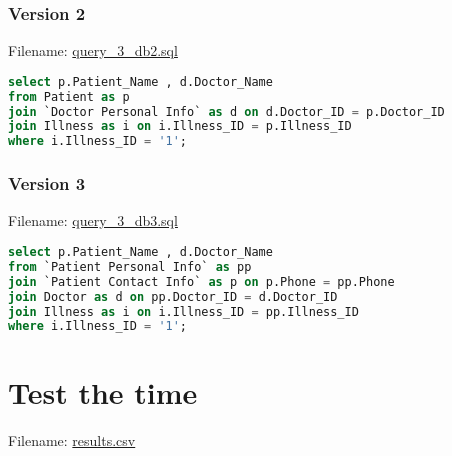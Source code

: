 \documentclass[12pt,arial]{article}
\begin{document}
\subsubsection{Version 2}
Filename: \url{query_3_db2.sql}
\begin{lstlisting}[language=SQL]
select p.Patient_Name , d.Doctor_Name
from Patient as p
join `Doctor Personal Info` as d on d.Doctor_ID = p.Doctor_ID
join Illness as i on i.Illness_ID = p.Illness_ID
where i.Illness_ID = '1';
\end{lstlisting}
\subsubsection{Version 3}
Filename: \url{query_3_db3.sql}
\begin{lstlisting}[language=SQL]
select p.Patient_Name , d.Doctor_Name
from `Patient Personal Info` as pp
join `Patient Contact Info` as p on p.Phone = pp.Phone
join Doctor as d on pp.Doctor_ID = d.Doctor_ID
join Illness as i on i.Illness_ID = pp.Illness_ID
where i.Illness_ID = '1';
\end{lstlisting}


\section{Test the time}
Filename: \url{results.csv}
\end{document}
